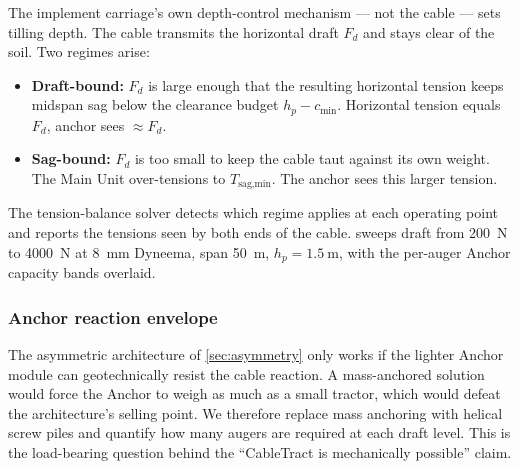 \documentclass[11pt,a4paper]{article}
\begin{document}
The implement carriage's own depth-control mechanism --- not the cable --- sets tilling depth. The cable transmits the horizontal draft $F_d$ and stays clear of the soil. Two regimes arise:

\begin{itemize}[leftmargin=1.6em,itemsep=0.15em]
    \item \textbf{Draft-bound:} $F_d$ is large enough that the resulting horizontal tension keeps midspan sag below the clearance budget $h_p - c_{\min}$. Horizontal tension equals $F_d$, anchor sees ${\approx}F_d$.
    \item \textbf{Sag-bound:} $F_d$ is too small to keep the cable taut against its own weight. The Main Unit over-tensions to $T_{\text{sag,min}}$. The anchor sees this larger tension.
\end{itemize}

The tension-balance solver detects which regime applies at each operating point and reports the tensions seen by both ends of the cable.  sweeps draft from \SI{200}{\newton} to \SI{4000}{\newton} at \SI{8}{\milli\meter} Dyneema, span \SI{50}{\meter}, $h_p = \SI{1.5}{\meter}$, with the per-auger Anchor capacity bands overlaid.

\subsubsection{Anchor reaction envelope}\label{sec:anchor}

The asymmetric architecture of \cref{sec:asymmetry} only works if the lighter Anchor module can geotechnically resist the cable reaction. A mass-anchored solution would force the Anchor to weigh as much as a small tractor, which would defeat the architecture's selling point. We therefore replace mass anchoring with helical screw piles and quantify how many augers are required at each draft level. This is the load-bearing question behind the ``CableTract is mechanically possible'' claim.
\end{document}
